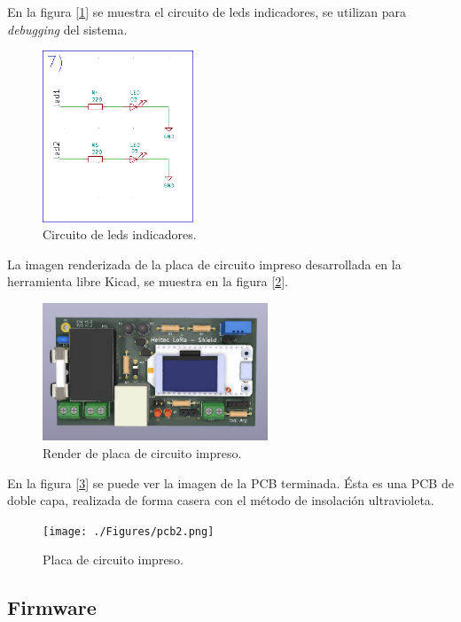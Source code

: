 En la figura [\ref{fig:esquematico7}] se muestra el circuito de leds indicadores, se utilizan para {\textit{debugging}} del sistema.

\begin{figure}[h!]
	\centering
	\includegraphics[width=0.4\textwidth]{./Figures/esquematico7.png}
	\caption{Circuito de leds indicadores.}
	\label{fig:esquematico7}
\end{figure}

La imagen renderizada de la placa de circuito impreso desarrollada en la herramienta libre Kicad, se muestra en la figura [\ref{fig:pcb1}].

\begin{figure}[h!]
	\centering
	\includegraphics[width=0.6\textwidth]{./Figures/pcb1.png}
	\caption{Render de placa de circuito impreso.}
	\label{fig:pcb1}
\end{figure} 

En la figura [\ref{fig:pcb2}] se puede ver la imagen de la PCB terminada. Ésta es una PCB de doble capa, realizada de forma casera con el método de insolación ultravioleta.

\begin{figure}[h!]
	\centering
	\texttt{[image: ./Figures/pcb2.png]}
	\caption{Placa de circuito impreso.}
	\label{fig:pcb2}
\end{figure} 

\subsection{Firmware}

